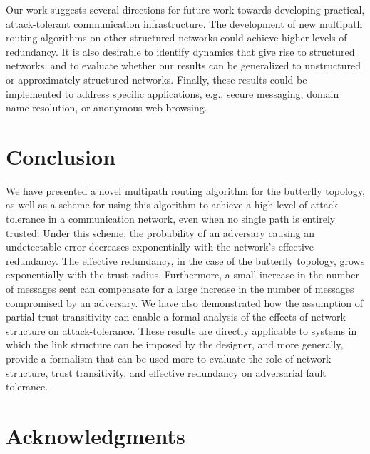 \documentclass{sig-alternate-05-2015}
\begin{document}
Our work suggests several directions for future work towards developing
practical, attack-tolerant communication infrastructure.
The development of new multipath routing algorithms on other structured
networks could achieve higher levels of redundancy.
It is also desirable to identify dynamics that give
rise to structured networks,
and to evaluate whether our results can be generalized to unstructured or
approximately structured networks.
Finally, these results could be implemented to address specific
applications, e.g., secure messaging, domain name resolution, or
anonymous web browsing.

\section{Conclusion}
\label{sec-conclusion}

We have presented a novel multipath routing algorithm for the butterfly
topology,
as well as a scheme for using this algorithm to achieve a high level of
attack-tolerance in a communication network,
even when no single path is entirely trusted.
Under this scheme, the probability of an adversary causing an undetectable error
decreases exponentially with the network's effective redundancy.
The effective redundancy, in the case of the butterfly topology,
grows exponentially with the trust radius.
Furthermore, a small increase in the number of messages sent can compensate
for a large increase in the number of messages compromised by an adversary.
We have also demonstrated how the assumption of partial trust
transitivity can enable a formal analysis of the effects of network structure
on attack-tolerance.
These results are directly applicable to systems in which the link
structure can be imposed by the designer,
and more generally, provide a formalism that can be used more to evaluate
the role of network structure, trust transitivity, and effective redundancy
on adversarial fault tolerance.

\section{Acknowledgments}

%

%
%
%
\end{document}
